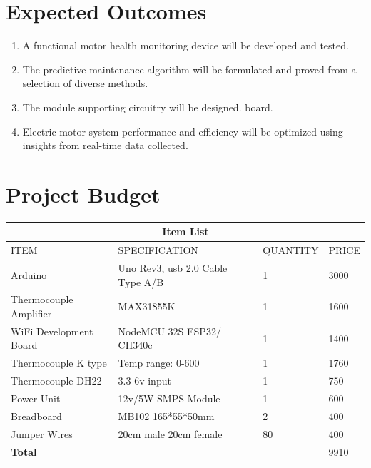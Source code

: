 \section{Expected Outcomes}
\begin{enumerate}
\item A functional motor health monitoring device will be developed and tested.
\item The predictive maintenance algorithm will be formulated and proved from a selection
of diverse methods.
\item The module supporting circuitry will be designed.
board.
\item Electric motor system performance and efficiency will be optimized using insights from real-time data collected.
\end{enumerate}
\newpage
\section{Project Budget}
\setlength{\arrayrulewidth}{0.5mm}
\setlength{\tabcolsep}{18pt}
\renewcommand{\arraystretch}{1.5}
	\begin{tabular}{ |p{3cm}|p{3cm}|p{3cm}|p{3cm}|  }
		\hline
		\multicolumn{4}{|c|}{\textbf{Item List}} \\
		\hline
		ITEM & SPECIFICATION & QUANTITY & PRICE \\
		\hline
		Arduino & Uno Rev3, usb 2.0 Cable Type A/B & 1 & 3000 \\
		\hline
		Thermocouple Amplifier & MAX31855K & 1 & 1600 \\
		\hline
		WiFi Development Board & NodeMCU 32S ESP32/ CH340c  & 1 & 1400 \\
		\hline
		Thermocouple K type&Temp range: 0-600  & 1 & 1760\\
		\hline
		Thermocouple DH22 & 3.3-6v input  & 1 &750 \\
		\hline
		Power Unit & 12v/5W SMPS Module & 1   & 600\\
		\hline
		Breadboard & MB102  165*55*50mm & 2 & 400 \\
		\hline
		Jumper Wires & 20cm male 20cm female & 80 & 400 \\
		\hline
		\textbf{Total} & & &9910 \\
		\hline
	\end{tabular}

